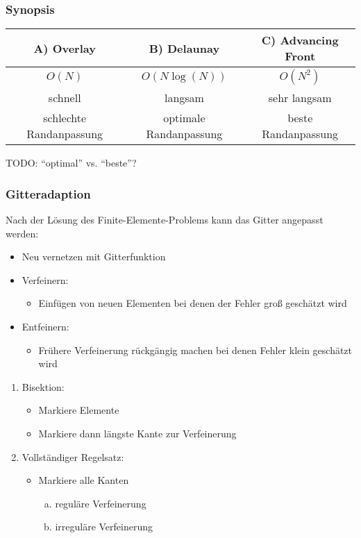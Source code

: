 \subsubsection*{Synopsis}


\begin{tabular}{c|c|c}
    A) Overlay & B) Delaunay & C) Advancing Front \\
    \hline
    $O(N)$ & $O(N \log(N))$ & $O(N^2)$ \\
    schnell & langsam & sehr langsam \\
    schlechte Randanpassung & optimale Randanpassung & beste Randanpassung
\end{tabular}

TODO: ``optimal'' vs. ``beste''?


\subsubsection{Gitteradaption}


Nach der Lösung des Finite-Elemente-Problems kann das Gitter angepasst werden:
\begin{itemize}
  \item
    Neu vernetzen mit Gitterfunktion
  \item
    Verfeinern:
    \begin{itemize}
      \item
        Einfügen von neuen Elementen bei denen der Fehler gro\ss{} geschätzt
        wird
    \end{itemize}
  \item
    Entfeinern:
    \begin{itemize}
      \item
        Frühere Verfeinerung rückgängig machen bei denen Fehler klein
        geschätzt wird
    \end{itemize}
\end{itemize}


\begin{enumerate}[1)]
  \item
    Bisektion:
    \begin{itemize}
      \item
        Markiere Elemente
      \item
        Markiere dann längste Kante zur Verfeinerung
    \end{itemize}
  \item
    Vollständiger Regelsatz:
    \begin{itemize}
      \item 
        Markiere alle Kanten
        \begin{enumerate}[a)]
          \item
            reguläre Verfeinerung
          \item
            irreguläre Verfeinerung
        \end{enumerate}
    \end{itemize}
\end{enumerate}


